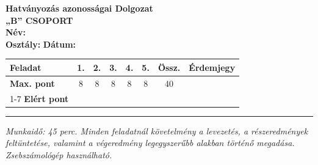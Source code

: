 \documentclass[11pt,a4paper]{article}
\begin{document}
\noindent
\begin{minipage}[t]{0.45\textwidth}
  \vspace{0pt}
  {\Large\textbf{Hatványozás azonosságai Dolgozat}}\\[2mm]
  {\large\textbf{„B” CSOPORT}}\\[2mm]
  \textbf{Név:} \underline{\hspace{4.5cm}}\\[2mm]
  \textbf{Osztály:} \underline{\hspace{1.5cm}} \quad \textbf{Dátum:} \underline{\hspace{2cm}}
\end{minipage}
\hfill
\begin{minipage}[t]{0.53\textwidth}
  \vspace{0pt}
  \begin{flushright}
  {\small
  \begin{tabular}{|l|c|c|c|c|c||c||c|}
    \hline
    \textbf{Feladat} & 1. & 2. & 3. & 4. & 5. & \textbf{Össz.} & \textbf{Érdemjegy} \\ \hline
    \textbf{Max. pont} & 8 & 8 & 8 & 8 & 8 & 40 & \\ \cline{1-7}
    \textbf{Elért pont} & & & & & & & \\ \hline
  \end{tabular}
  }
  \end{flushright}
\end{minipage}
\vspace{2mm}
\hrule
\vspace{4mm}

\noindent
\textit{Munkaidő: 45 perc. Minden feladatnál követelmény a levezetés, a részeredmények feltüntetése, valamint a végeredmény legegyszerűbb alakban történő megadása. Zsebszámológép használható.}

\vspace{3mm}
\end{document}
